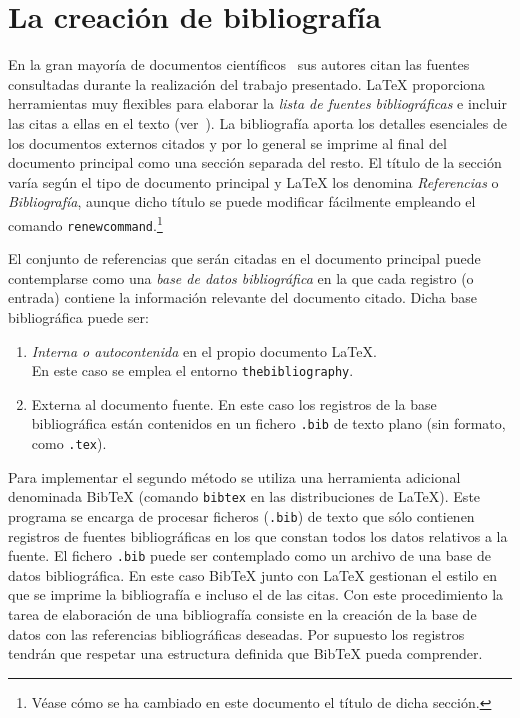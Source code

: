 \documentclass[ 		%
	11pt,				%
	a4paper,			%
	twoside,			%
	openright,			%
	final       		%
]{book}
\begin{document}
\chapter{La creación de bibliografía}
En la gran mayoría de documentos científicos~\cite[pág. 5]{salido15} sus autores citan las fuentes consultadas durante la realización del trabajo presentado. \LaTeX{} proporciona herramientas muy flexibles para elaborar la \emph{lista de fuentes bibliográficas} e incluir las citas a ellas en el texto (ver~\cite{cascales00,cascales03,goos04,kopka04,lamport94}). La bibliografía aporta los detalles esenciales de los documentos externos citados y por lo general se imprime al final del documento principal como una sección separada del resto. El título de la sección varía según el tipo de documento principal y \LaTeX{} los denomina \emph{Referencias} o \emph{Bibliografía}, aunque dicho título se puede modificar fácilmente empleando el comando \texttt{renewcommand}.\footnote{Véase cómo se ha cambiado en este documento el título de dicha sección.}


El conjunto de referencias que serán citadas en el documento principal puede contemplarse como una \emph{base de datos bibliográfica} en la que cada registro (o entrada) contiene la información relevante del documento citado. Dicha base bibliográfica puede ser:
\begin{enumerate}
	\item \emph{Interna o autocontenida} en el propio documento \LaTeX{}.\\
	 En este caso se emplea el entorno \texttt{thebibliography}.
	
	\item Externa al documento fuente. En este caso los registros de la base bibliográfica están contenidos en un fichero \texttt{.bib} de texto plano (sin formato, como \texttt{.tex}).
\end{enumerate}

Para implementar el segundo método se utiliza una herramienta adicional denominada Bib\TeX{} (comando \texttt{bibtex} en las distribuciones de \LaTeX). Este programa se encarga de procesar ficheros (\texttt{.bib}) de texto que sólo contienen registros de fuentes bibliográficas en los que constan todos los datos relativos a la fuente. El fichero \texttt{.bib} puede ser contemplado como un archivo de una base de datos bibliográfica. En este caso Bib\TeX{} junto con \LaTeX{} gestionan el estilo en que se imprime la bibliografía e incluso el de las citas. Con este procedimiento la tarea de elaboración de una bibliografía consiste en la creación de la base de datos con las referencias bibliográficas deseadas. Por supuesto los registros tendrán que respetar una estructura definida que Bib\TeX{} pueda comprender.
\end{document}
